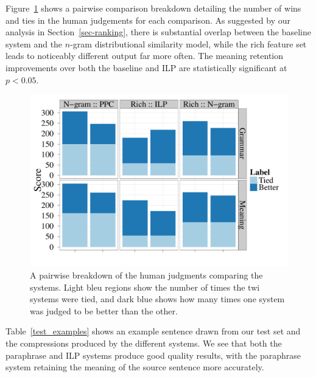 \documentclass[11pt]{article}
\begin{document}
Figure~\ref{num-ties-wins} shows a pairwise comparison breakdown
detailing the number of wins and ties in the human judgements for each
comparison. As suggested by our analysis in Section~\ref{sec-ranking},
there is substantial overlap between the baseline system and the
$n$-gram distributional similarity model, while the rich feature set
leads to noticeably different output far more often. The meaning
retention improvements over both the baseline and ILP are
statistically significant at $p < 0.05$.

\begin{figure}[!t]
\begin{center}
\includegraphics[width=0.99\linewidth]{figures/pairwise_comparison.pdf}
\end{center}
\caption{A pairwise breakdown of the human judgments comparing
  the systems. Light bleu regions show the number of times the twi systems were tied, and dark blue shows how many times one system was judged to be better than the other.}\label{num-ties-wins}
\end{figure}

Table~\ref{test_examples} shows an example sentence drawn from our
test set and the compressions produced by the different systems. We
see that both the paraphrase and ILP systems produce good quality
results, with the paraphrase system retaining the meaning of the
source sentence more accurately.
\end{document}
